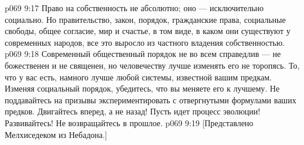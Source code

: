 \vs p069 9:17 Право на собственность не абсолютно; оно --- исключительно социально. Но правительство, закон, порядок, гражданские права, социальные свободы, общее согласие, мир и счастье, в том виде, в каком они существуют у современных народов, все это выросло из частного владения собственностью.
\vs p069 9:18 Современный общественный порядок не во всем справедлив --- не божественен и не священен, но человечеству лучше изменять его не торопясь. То, что у вас есть, намного лучше любой системы, известной вашим предкам. Изменяя социальный порядок, убедитесь, что вы меняете его к лучшему. Не поддавайтесь на призывы экспериментировать с отвергнутыми формулами ваших предков. Двигайтесь вперед, а не назад! Пусть идет процесс эволюции! Развивайтесь! Не возвращайтесь в прошлое.
\vsetoff
\vs p069 9:19 [Представлено Мелхиседеком из Небадона.]
